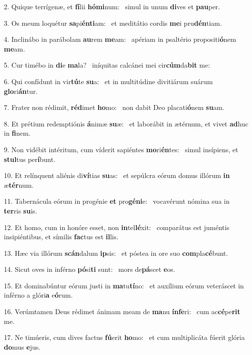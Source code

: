 2. Quique terrígenæ, et \textbf{fí}lii \textbf{hó}\textbf{mi}num: \ast\  simul in unum \textbf{di}ves et \textbf{pau}per.\

3. Os meum loquétur \textbf{sa}pi\textbf{én}\textbf{ti}am: \ast\  et meditátio cordis \textbf{me}i pru\textbf{dén}tiam.\

4. Inclinábo in parábolam \textbf{au}rem \textbf{me}am: \ast\  apériam in psaltério propositi\textbf{ó}nem \textbf{me}am.\

5. Cur timébo in \textbf{di}e \textbf{ma}la? \ast\  iníquitas calcánei mei cir\textbf{cúm}da\textbf{bit} me:\

6. Qui confídunt in vir\textbf{tú}te \textbf{su}a: \ast\  et in multitúdine divitiárum suárum \textbf{glo}ri\textbf{án}tur.\

7. Frater non rédimit, \textbf{réd}imet \textbf{ho}mo: \ast\  non dabit Deo placati\textbf{ó}nem \textbf{su}am.\

8. Et prétium redemptiónis \textbf{á}nimæ \textbf{su}æ: \ast\  et laborábit in ætérnum, et vivet \textbf{ad}huc in \textbf{fi}nem.\

9. Non vidébit intéritum, cum víderit sapiéntes \textbf{mo}ri\textbf{én}tes: \ast\  simul insípiens, et \textbf{stul}tus per\textbf{í}bunt.\

10. Et relínquent aliénis di\textbf{ví}tias \textbf{su}as: \ast\  et sepúlcra eórum domus illórum \textbf{in} æ\textbf{tér}num.\

11. Tabernácula eórum in progénie \textbf{et} pro\textbf{gé}\textbf{ni}e: \ast\  vocavérunt nómina sua in \textbf{ter}ris \textbf{su}is.\

12. Et homo, cum in honóre esset, non \textbf{in}tel\textbf{lé}xit: \ast\  comparátus est juméntis insipiéntibus, et símilis \textbf{fac}tus est \textbf{il}lis.\

13. Hæc via illórum \textbf{scán}dalum \textbf{ip}sis: \ast\  et póstea in ore suo \textbf{com}pla\textbf{cé}bunt.\

14. Sicut oves in inférno \textbf{pó}si\textbf{ti} sunt: \ast\  mors de\textbf{pá}scet \textbf{e}os.\

15. Et dominabúntur eórum justi in \textbf{ma}tu\textbf{tí}no: \ast\  et auxílium eórum veteráscet in inférno a glóri\textbf{a} e\textbf{ó}rum.\

16. Verúmtamen Deus rédimet ánimam meam de \textbf{ma}nu \textbf{ín}\textbf{fe}ri: \ast\  cum ac\textbf{cé}pe\textbf{rit} me.\

17. Ne timúeris, cum dives factus \textbf{fú}erit \textbf{ho}mo: \ast\  et cum multiplicáta fúerit glória \textbf{do}mus \textbf{e}jus.\

